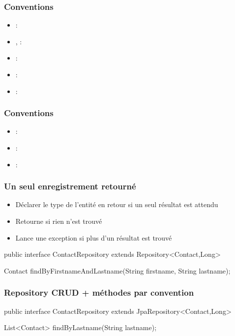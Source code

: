 \begin{frame}
 \frametitle{Conventions}
 \begin{itemize}
  \item {} : 
  \item {},  : 
  \item {} : 
  \item {} : 
  \item {} : 
 \end{itemize}
\end{frame}

\begin{frame}
 \frametitle{Conventions}
 \begin{itemize}
  \item {} : 
  \item {} : 
  \item {} : 
 \end{itemize}
\end{frame}

\begin{frame}[fragile]
 \frametitle{Un seul enregistrement retourné}
 \begin{itemize}
  \item Déclarer le type de l'entité en retour si un seul résultat est attendu
  \item Retourne  si rien n'est trouvé
  \item Lance une exception si plus d'un résultat est trouvé
 \end{itemize}
 \begin{javacode}
public interface ContactRepository extends Repository<Contact,Long> {

  Contact findByFirstnameAndLastname(String firstname, 
                                           String lastname);

}  
 \end{javacode}
\end{frame}

\begin{frame}[fragile]
 \frametitle{Repository CRUD + méthodes par convention}
 \begin{javacode}
public interface ContactRepository extends JpaRepository<Contact,Long> {

  List<Contact> findByLastname(String lastname);

}  
 \end{javacode}
\end{frame}

